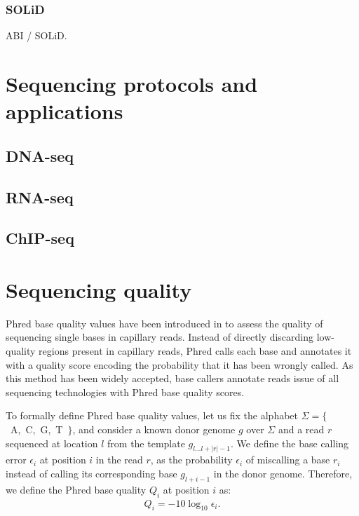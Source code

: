 \subsubsection{SOLiD}
ABI / SOLiD.

\section{Sequencing protocols and applications}

\subsection{DNA-seq}
\subsection{RNA-seq}
\subsection{ChIP-seq}

\section{Sequencing quality}


Phred base quality values have been introduced in \citep{Ewing1998, Ewing1998b} to assess the quality of sequencing single bases in capillary reads.
Instead of directly discarding low-quality regions present in capillary reads, Phred calls each base and annotates it with a quality score encoding the probability that it has been wrongly called.
As this method has been widely accepted, base callers annotate reads issue of all sequencing technologies with Phred base quality scores.

To formally define Phred base quality values, let us fix the alphabet $\Sigma = \{$~A,~C,~G,~T~$\}$, and consider a known donor genome $g$ over $\Sigma$ and a read $r$ sequenced at location $l$ from the template $g_{l \dots l+|r|-1}$.
We define the base calling error $\epsilon_i$ at position $i$ in the read $r$, as the probability $\epsilon_i$ of miscalling a base $r_i$ instead of calling its corresponding base $g_{l+i-1}$ in the donor genome.
Therefore, we define the Phred base quality $Q_i$ at position $i$ as:
\begin{eqnarray}
Q_i = -10 \log_{10} \epsilon_i.
\end{eqnarray}


